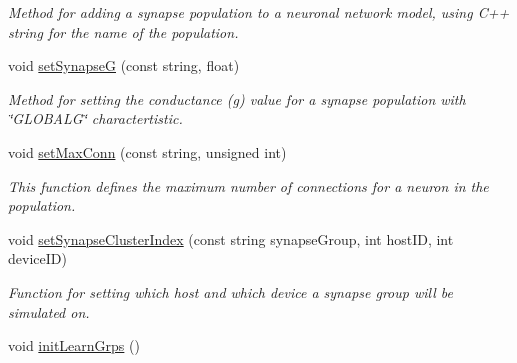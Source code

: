 \begin{DoxyCompactItemize}
\begin{DoxyCompactList}\small\item\em Method for adding a synapse population to a neuronal network model, using C++ string for the name of the population. \end{DoxyCompactList}\item 
void \hyperlink{classNNmodel_a06dd91d3a28b70b444e0866859a348f7}{set\+Synapse\+G} (const string, float)
\begin{DoxyCompactList}\small\item\em Method for setting the conductance (g) value for a synapse population with \char`\"{}\+G\+L\+O\+B\+A\+L\+G\char`\"{} charactertistic. \end{DoxyCompactList}\item 
void \hyperlink{classNNmodel_abcd74b0eb3c2696069320bd929070d4b}{set\+Max\+Conn} (const string, unsigned int)
\begin{DoxyCompactList}\small\item\em This function defines the maximum number of connections for a neuron in the population. \end{DoxyCompactList}\item 
void \hyperlink{classNNmodel_a2b7ad279fd8e68d951957f21bbb072c5}{set\+Synapse\+Cluster\+Index} (const string synapse\+Group, int host\+I\+D, int device\+I\+D)
\begin{DoxyCompactList}\small\item\em Function for setting which host and which device a synapse group will be simulated on. \end{DoxyCompactList}\item 
void \hyperlink{classNNmodel_a3de3cfc04cb28e939225341ee10e2119}{init\+Learn\+Grps} ()
\end{DoxyCompactItemize}
